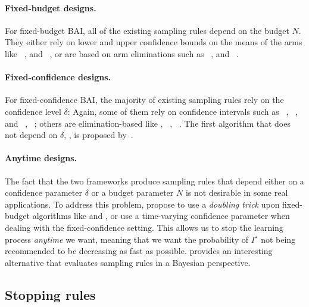 \paragraph{Fixed-budget designs.}

For fixed-budget BAI, all of the existing sampling rules depend on the budget $N$. They either rely on lower and upper confidence bounds on the means of the arms like \UCBE~\citep{audibert2010budget}, and \UGapE~\citep{gabillon2012ugape}, or are based on arm eliminations such as \SR~\citep{audibert2010budget}, and \SHA~\citep{karnin2013sha}.

\paragraph{Fixed-confidence designs.}

For fixed-confidence BAI, the majority of existing sampling rules rely on the confidence level $\delta$: Again, some of them rely on confidence intervals such as \LUCB~\citep{kalyanakrishnan2012lucb}, \UGapE~\citep{gabillon2012ugape}, \KLLUCB and \KLRacing~\citep{kaufmann2013kl}, \LIL~\citep{jamieson2014lilucb}; others are elimination-based like \SE, \ME~\citep{even-dar2003confidence}, \EGE~\citep{karnin2013sha}. The first algorithm that does not depend on $\delta$, \Track, is proposed by~\cite{garivier2016tracknstop}.

\paragraph{Anytime designs.}

The fact that the two frameworks produce sampling rules that depend either on a confidence parameter $\delta$ or a budget parameter $N$ is not desirable in some real applications. To address this problem, \cite{jun2016atlucb} propose to use a \emph{doubling trick} upon fixed-budget algorithms like \SR and \SHA, or use a time-varying confidence parameter when dealing with the fixed-confidence setting. This allows us to stop the learning process \emph{anytime} we want, meaning that we want the probability of $I^\star$ not being recommended to be decreasing as fast as possible. \cite{russo2016ttts} provides an interesting alternative that evaluates sampling rules in a Bayesian perspective. %

\subsection{Stopping rules}\label{sec:mab.bai.stopping}

